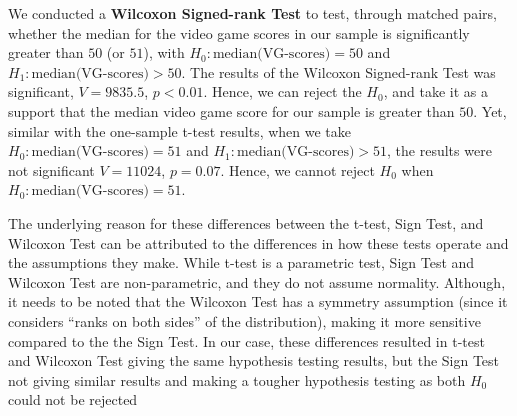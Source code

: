 \documentclass[
]{article}
\newenvironment{Shaded}{\begin{snugshade}}{\end{snugshade}}
\newcommand{\AttributeTok}[1]{\textcolor[rgb]{0.13,0.29,0.53}{#1}}
\newcommand{\CommentTok}[1]{\textcolor[rgb]{0.56,0.35,0.01}{\textit{#1}}}
\newcommand{\DecValTok}[1]{\textcolor[rgb]{0.00,0.00,0.81}{#1}}
\newcommand{\FloatTok}[1]{\textcolor[rgb]{0.00,0.00,0.81}{#1}}
\newcommand{\FunctionTok}[1]{\textcolor[rgb]{0.13,0.29,0.53}{\textbf{#1}}}
\newcommand{\NormalTok}[1]{#1}
\newcommand{\OtherTok}[1]{\textcolor[rgb]{0.56,0.35,0.01}{#1}}
\newcommand{\SpecialCharTok}[1]{\textcolor[rgb]{0.81,0.36,0.00}{\textbf{#1}}}
\newcommand{\StringTok}[1]{\textcolor[rgb]{0.31,0.60,0.02}{#1}}
\begin{document}
We conducted a \textbf{Wilcoxon Signed-rank Test} to test, through
matched pairs, whether the median for the video game scores in our
sample is significantly greater than \(50\) (or \(51\)), with
\(H_0 : \text{median(VG-scores)} = 50\) and
\(H_1 : \text{median(VG-scores)} > 50\). The results of the Wilcoxon
Signed-rank Test was significant, \(V = 9835.5\), \(p < 0.01\). Hence,
we can reject the \(H_0\), and take it as a support that the median
video game score for our sample is greater than \(50\). Yet, similar
with the one-sample t-test results, when we take
\(H_0 : \text{median(VG-scores)} = 51\) and
\(H_1 : \text{median(VG-scores)} > 51\), the results were not
significant \(V = 11024\), \(p = 0.07\). Hence, we cannot reject \(H_0\)
when \(H_0 : \text{median(VG-scores)} = 51\).

The underlying reason for these differences between the t-test, Sign
Test, and Wilcoxon Test can be attributed to the differences in how
these tests operate and the assumptions they make. While t-test is a
parametric test, Sign Test and Wilcoxon Test are non-parametric, and
they do not assume normality. Although, it needs to be noted that the
Wilcoxon Test has a symmetry assumption (since it considers ``ranks on
both sides'' of the distribution), making it more sensitive compared to
the the Sign Test. In our case, these differences resulted in t-test and
Wilcoxon Test giving the same hypothesis testing results, but the Sign
Test not giving similar results and making a tougher hypothesis testing
as both \(H_0\) could not be rejected

\begin{Shaded}
\end{Shaded}
\end{document}
